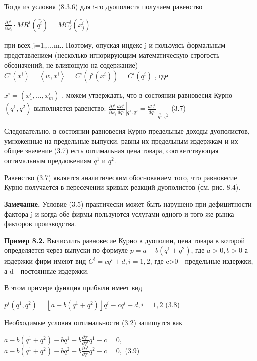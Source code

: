 \documentclass[12pt, 4paper]{book}
\begin{document}
{Тогда из условия (8.3.6) для i-го дуополиста получаем равенство
\begin{center}
$\frac{\partial f^i}{\partial x_{j}^i}\cdot MR^i (\bar{q^i})=MC_{j}^i (\bar{x_{j}^i})$
\end{center}
при всех j=1,...,m.. Поэтому, опуская индекс j и пользуясь формальным представлением (несколько игнорирующим математическую строгость обозначений, не влияющую на содержание) $C^i(x^i) = \left\langle w,x^i\right\rangle = C^i(f^i(x^i)) = C^i(q^i)$ , где 
\begin{center}
$x^i=(x_{1}^i,...,x_{m}^i)$ , можем утверждать, что в состоянии равновесия Курно $(\bar{q^1},\bar{q^2})$ выполняется равенство:
$\frac{\partial f^i}{\partial x_{j}^i}\frac{d R^i}{d q^i}|_{\bar{q^1},\bar{q^2}} = \frac{d C^i}{d q^i}|_{\bar{q^1},\bar{q^2}}$ (3.7)
\end{center}
\par

Следовательно, в состоянии равновесия Курно предельные доходы дуополистов, умноженные на предельные выпуски, равны их предельным издержкам и их общее значение (3.7) есть оптимальная цена товара, соответствующая оптимальным предложениям $\bar{q^1}$ и $\bar{q^2}$.
\par

Равенство (3.7) является аналитическим обоснованием того, что равновесие Курно получается в пересечении кривых реакций дуополистов (см. рис. 8.4).
\par

\textbf{Замечание.} Условие (3.5) практически может быть нарушено при дефицитности фактора j и когда обе фирмы пользуются услугами одного и того же рынка факторов производства.
\par

\textbf{Пример 8.2.} Вычислить равновесие Курно в дуополии, цена товара в которой определяется через выпуски по формуле $p = a-b(q^1 +q^2)$, где $a >0,b>0 $ а издержки фирм имеют вид $C^i = cq^i+d, i=1,2$, где c>0 - предельные издержки, а d - постоянные издержки.
\par

В этом примере функция прибыли имеет вид 
\begin{center}
$p^i(q^1,q^2)=\left\lfloor a-b(q^1+q^2)\right\rfloor q^i - c q^i - d,i = 1,2$ (3.8)
\end{center}
Необходимые условия оптимальности (3.2) запишутся как
\begin{center}
$a-b(q^1 + q^2)-bq^1 - b\frac{\partial q^2}{\partial q^1}q^1 - c=0,$\\
$a-b(q^1 + q^2)-bq^2 - b\frac{\partial q^1}{\partial q^2}q^2 - c=0,$ (3.9)
\end{center}
\par

}
\end{document}

